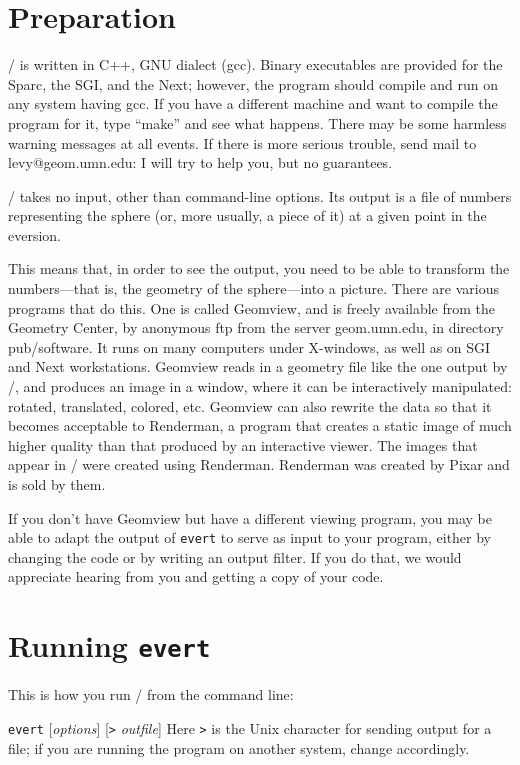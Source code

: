 \section*{Preparation}

\Ev/ is written in C++, GNU dialect (gcc).  Binary executables are
provided for the Sparc, the SGI, and the Next; however, the program
should compile and run on any system having gcc.  If you have a
different machine and want to compile the program for it, type
``make'' and see what happens.  There may be some harmless warning
messages at all events. If there is more serious trouble, send mail to
levy@geom.umn.edu: I will try to help you, but no guarantees.

\Ev/ takes no input, other than command-line options.  Its output is a
file of numbers representing the sphere (or, more usually, a piece of it) at
a given point in the eversion.

This means that, in order to see the output, you need to be able to
transform the numbers---that is, the geometry of the sphere---into a
picture.  There are various programs that do this.  One is called
Geomview, and is freely available from the Geometry Center, by
anonymous ftp from the server geom.umn.edu, in directory pub/software.
It runs on many computers under X-windows, as well as on SGI and Next
workstations.  Geomview reads in a geometry file like the one output
by \ev/, and produces an image in a window, where it can be
interactively manipulated: rotated, translated, colored, etc.
Geomview can also rewrite the data so that it becomes acceptable to
Renderman, a program that creates a static image of much higher
quality than that produced by an interactive viewer.  The images that
appear in \OI/ were created using Renderman.  Renderman was created by
Pixar and is sold by them.

If you don't have Geomview but have a different viewing program, you
may be able to adapt the output of {\tt evert} to serve as input to
your program, either by changing the code or by writing an output
filter.  If you do that, we would appreciate hearing from you and
getting a copy of your code.

\section*{Running {\tt evert}}

This is how you run \ev/ from the command line:

\smallbreak
{\tt evert} [{\it options\/}] [{\tt >} {\it outfile}]
\smallbreak\noindent
Here {\tt >} is the Unix character for sending output for a file;
if you are running the program on another system, change accordingly.

